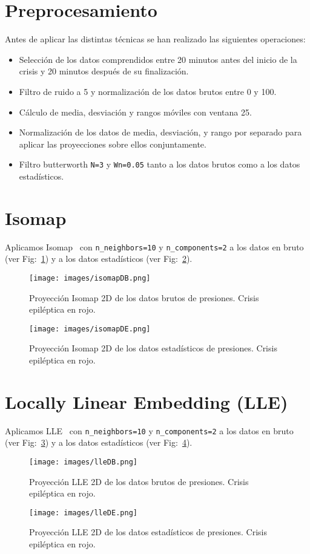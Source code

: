 \documentclass[a4paper,12pt,twoside,oldfontcommands]{memoir}
\begin{document}
\section{Preprocesamiento}
Antes de aplicar las distintas técnicas se han realizado las siguientes operaciones: 
\begin{itemize}
    \item Selección de los datos comprendidos entre 20 minutos antes del inicio de la crisis y 20 minutos después de su finalización. 
    \item Filtro de ruido a 5 y normalización de los datos brutos entre 0 y 100.
    \item Cálculo de media, desviación y rangos móviles con ventana 25. 
    \item Normalización de los datos de media, desviación, y rango por separado para aplicar las proyecciones sobre ellos conjuntamente. 
    \item Filtro butterworth \texttt{N=3} y \texttt{Wn=0.05} tanto a los datos brutos como a los datos estadísticos.  
\end{itemize}

\section{Isomap}
Aplicamos Isomap~\cite{tenenbaum2000global} con \texttt{n\_neighbors=10} y \texttt{n\_components=2} a los datos en bruto (ver Fig:~\ref{fig:isomapDB}) y a los datos estadísticos (ver Fig:~\ref{fig:isomapDE}). 
\begin{figure}
    \centering
    \texttt{[image: images/isomapDB.png]}
    \caption{Proyección Isomap 2D de los datos brutos de presiones. Crisis epiléptica en rojo.}
    \label{fig:isomapDB}
\end{figure}
\begin{figure}
    \centering
    \texttt{[image: images/isomapDE.png]}
    \caption{Proyección Isomap 2D de los datos estadísticos de presiones. Crisis epiléptica en rojo.}
    \label{fig:isomapDE}
\end{figure}

\section{Locally Linear Embedding (LLE)}
Aplicamos LLE~\cite{roweis2000nonlinear} con \texttt{n\_neighbors=10} y \texttt{n\_components=2} a los datos en bruto (ver Fig:~\ref{fig:lleDB}) y a los datos estadísticos (ver Fig:~\ref{fig:lleDE}).
\begin{figure}
    \centering
    \texttt{[image: images/lleDB.png]}
    \caption{Proyección LLE 2D de los datos brutos de presiones. Crisis epiléptica en rojo.}
    \label{fig:lleDB}
\end{figure}
\begin{figure}
    \centering
    \texttt{[image: images/lleDE.png]}
    \caption{Proyección LLE 2D de los datos estadísticos de presiones. Crisis epiléptica en rojo.}
    \label{fig:lleDE}
\end{figure}
\end{document}
